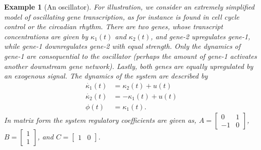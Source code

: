 \documentclass{article}
\newcommand{\1}{\mathbbm{1}}
\newtheorem{example}{Example}
\begin{document}
\begin{example}[An oscillator]\label{ex:oscillator}
For illustration, we consider an extremely simplified model of oscillating gene transcription,
as for instance is found in cell cycle control or the circadian rhythm.
There are two genes, 
whose transcript concentrations are given by $\kappa_1(t)$ and $\kappa_2(t)$, 
and gene-2 upregulates gene-1, while gene-1 downregulates gene-2 with equal strength.
Only the dynamics of gene-1 are consequential to the oscillator 
(perhaps the amount of gene-1 activates another downstream gene network). 
Lastly, both genes are equally upregulated by an exogenous signal.
The dynamics of the system are described by
    \begin{align*}
      \dot{\kappa_{1}}(t) &= \kappa_{2}(t) + u(t) \\
        \dot{\kappa_{2}}(t) &= - \kappa_{1}(t) + u(t) \\
        \phi(t) &= \kappa_{1}(t)   .
    \end{align*}
In matrix form the system regulatory coefficients are given as,
$A \!=\! \left[\begin{smallmatrix} 0 & 1 \\ -1 & 0 \end{smallmatrix}\right]$, 
$B \! =\! \left[\begin{smallmatrix} 1 \\ 1 \end{smallmatrix}\right]$,
and $C \!=\! \left[\begin{smallmatrix} 1 & 0 \end{smallmatrix}\right]$.

\end{example}
\end{document}
